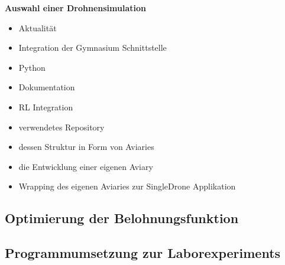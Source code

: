 \textbf{Auswahl einer Drohnensimulation}
\begin{itemize}
    \item Aktualität
    \item Integration der Gymnasium Schnittstelle
    \item Python
    \item Dokumentation
    \item RL Integration
\end{itemize}

\begin{itemize}
    \item verwendetes Repository
    \item dessen Struktur in Form von Aviaries
    \item die Entwicklung einer eigenen Aviary 
    \item Wrapping des eigenen Aviaries zur SingleDrone Applikation
\end{itemize}
\subsection{Optimierung der Belohnungsfunktion}
\subsection{Programmumsetzung zur Laborexperiments}
